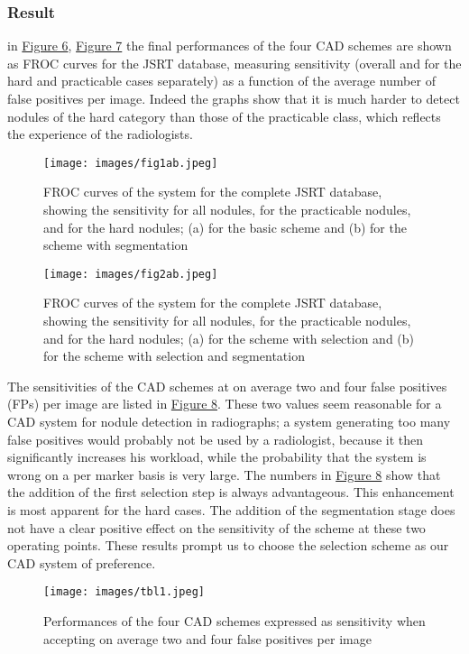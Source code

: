 \documentclass[hidelinks,12pt]{article}
\begin{document}
\subsubsection{Result}
in \hyperref[fig:5]{Figure 6}, \hyperref[fig:6]{Figure 7}
the final performances of the four
CAD schemes are shown as FROC curves for the JSRT
database, measuring sensitivity (overall and for the hard
and practicable cases separately) as a function of the average
number of false positives per image. Indeed the graphs
show that it is much harder to detect nodules of the hard
category than those of the practicable class, which reflects
the experience of the radiologists.
\newpage
\begin{figure}[h]
      \texttt{[image: images/fig1ab.jpeg]}
      \centering
      \label{fig:5}
      \caption{FROC curves of the system for the complete JSRT database, showing the sensitivity for all nodules, for the practicable nodules, and for the hard nodules; (a) for the basic scheme and (b) for the scheme with segmentation}
\end{figure}  

\begin{figure}[h]
      \texttt{[image: images/fig2ab.jpeg]}
      \vspace{-1em}
      \centering
      \label{fig:6}
      \caption{FROC curves of the system for the complete JSRT database, showing the sensitivity for all nodules, for the practicable nodules, and for the hard nodules; (a) for the scheme with selection and (b) for the scheme with selection and segmentation}
\end{figure}  
\newpage
The sensitivities of the CAD schemes at on average two
and four false positives (FPs) per image are listed in \hyperref[fig:7]{Figure 8}. These two values seem reasonable for a CAD system for nodule detection in radiographs; a system generating
too many false positives would probably not be used by a radiologist, because it then significantly increases his workload,
while the probability that the system is wrong on a per
marker basis is very large. The numbers in \hyperref[fig:7]{Figure 8} show that the addition of the first selection step is always advantageous. This enhancement is most apparent for the hard
cases. The addition of the segmentation stage does not have
a clear positive effect on the sensitivity of the scheme at these
two operating points. These results prompt us to choose the
selection scheme as our CAD system of preference.

\begin{figure}[h]
      \texttt{[image: images/tbl1.jpeg]}
      \centering
      \label{fig:7}
      \caption{Performances of the four CAD schemes expressed as sensitivity when accepting on average two and four false positives per image}
\end{figure}  
\end{document}
